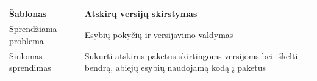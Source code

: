 \begin{center}
    \begin{tabular}{|p{5cm}|p{10cm}|}
        \hline
        Šablonas &  Atskirų versijų skirstymas \\ [0.5ex]
        \hline\hline
        Sprendžiama problema & Esybių pokyčių ir versijavimo valdymas\\
        \hline
        Siūlomas sprendimas & Sukurti atskirus paketus skirtingoms versijoms bei iškelti bendrą, abiejų esybių naudojamą kodą į paketus \\
        \hline
    \end{tabular}

\end{center}

